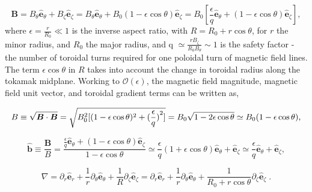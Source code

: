 \documentclass[12pt]{article}
\numberwithin{equation}{subsection}
\begin{document}
   \begin{equation}
      \bm{B} = B_\theta\bm{\hat{e}}_\theta + B_\zeta\bm{\hat{e}}_\zeta =
               B_\theta\bm{\hat{e}}_\theta + B_0(1-\epsilon\cos\theta)\bm{\hat{e}}_\zeta =
               B_0[\frac{\epsilon}{q}\bm{\hat{e}}_\theta + (1-\epsilon\cos\theta)\bm{\hat{e}}_\zeta],
   \end{equation}
where $\epsilon=\frac{r}{R_0} \ll 1$ is the inverse aspect ratio, with $R=R_0+r\cos\theta$, for $r$ the minor radius,
and $R_0$ the major radius, and q $\simeq\frac{rB_\zeta}{R_0B_\theta}\sim1$ is the safety factor - the number of
toroidal turns required for one poloidal turn of magnetic field lines. The term $\epsilon\cos\theta$ in $R$ takes into
account the change in toroidal radius along the tokamak midplane. Working to $\mathcal{O}(\epsilon)$, the magnetic field
magnitude, magnetic field unit vector, and toroidal gradient terms can be written as,
   
   \begin{equation}
      B \equiv \sqrt{\bm{B}\cdot\bm{B}} = \sqrt{B_0^2[(1-\epsilon\cos\theta)^2 + (\frac{\epsilon}{q})\strut^2]} =
          B_0\sqrt{1-2\epsilon\cos\theta} \simeq B_0(1-\epsilon\cos\theta),
   \end{equation}

   \begin{equation}
      \bm{\hat{b}} \equiv \frac{\bm{B}}{B} = \frac{\frac{\epsilon}{q}\bm{\hat{e}}_\theta + (1-\epsilon\cos\theta)\bm{\hat{e}}_\zeta}
                     {1-\epsilon\cos\theta} \simeq \frac{\epsilon}{q}(1+\epsilon\cos\theta)\bm{\hat{e}}_\theta + 
                     \bm{\hat{e}}_\zeta \simeq \frac{\epsilon}{q}\bm{\hat{e}}_\theta + \bm{\hat{e}}_\zeta,
   \end{equation}

   \begin{equation}
      \nabla = \partial_r\bm{\hat{e}}_r + \frac{1}{r}\partial_\theta\bm{\hat{e}}_\theta +
               \frac{1}{R}\partial_\zeta\bm{\hat{e}}_\zeta = \partial_r\bm{\hat{e}}_r   +
               \frac{1}{r}\partial_\theta\bm{\hat{e}}_\theta + \frac{1}{R_0 + r\cos\theta}\partial_\zeta\bm{\hat{e}}_\zeta\;.
   \end{equation}
\end{document}
